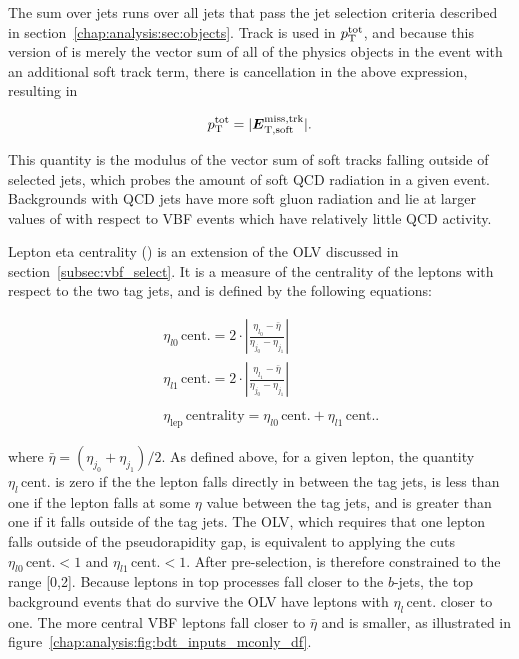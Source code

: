 \noindent
The sum over jets runs over all jets that pass the jet selection
criteria described in section~\ref{chap:analysis:sec:objects}. 
Track \vmet is used in $p_{\rm T}^{\rm tot}$, and because this version of \etmiss
is merely the
vector sum of all of the physics objects in the event with an
additional soft track term, there is cancellation in the above
expression, resulting in

\begin{equation}
\begin{aligned}
\label{chap:analysis:equation:pttot_2}
p_{\rm T}^{\rm tot} = |\boldsymbol{E}_{\mathrm{T,soft}}^{\mathrm{miss,trk}}|.
\end{aligned}
\end{equation}

\noindent
This quantity is the modulus of the vector sum of soft tracks
falling outside of selected jets, which probes the amount of soft QCD
radiation in a given event. Backgrounds with QCD jets have more soft
gluon radiation and lie at larger values of \pTtot with respect to VBF
events which have relatively little QCD activity. 

Lepton eta centrality (\lepEtaCent) is an extension of the OLV
discussed in section~\ref{subsec:vbf_select}. It is a measure of the
centrality of the leptons with respect to the two tag jets, and is
defined by the following equations:

\begin{eqnarray}
&& \eta_{l0} \, \textrm{cent.} = 2 \cdot
|\frac{\eta_{l_0}-\bar{\eta}}{\eta_{j_0}-\eta_{j_1}}|  \nonumber\\
&& \eta_{l1} \, \textrm{cent.} = 2 \cdot
|\frac{\eta_{l_1}-\bar{\eta}}{\eta_{j_0}-\eta_{j_1}}|  \nonumber\\
&&\nonumber \\
&& \eta_{\mathrm{lep}} \, \textrm{centrality}
= \eta_{l0} \, \textrm{cent.} + \eta_{l1} \, \textrm{cent.}.
\label{eqn:contOLV_def}
\end{eqnarray}

\noindent
where $\bar{\eta} = (\eta_{j_0}+\eta_{j_1})/2$. As defined above, for
a given lepton, the quantity $\eta_{l} \, \textrm{cent.}$ is zero if
the the lepton falls directly in between the tag jets, is less than
one if the lepton falls at some $\eta$ value between the tag jets, and is greater than one if
it falls outside of the tag jets. The OLV, which requires that one
lepton falls outside of the pseudorapidity gap, is equivalent to
applying the cuts $\eta_{l0} \, \textrm{cent.} < 1$ and 
$\eta_{l1} \, \textrm{cent.} < 1$. After pre-selection, \lepEtaCent is therefore constrained to the range [0,2]. Because
leptons in top processes fall closer to the $b$-jets, the top background
events that do survive the OLV have leptons with $\eta_{l} \, \textrm{cent.}$ closer to
one. The more central VBF leptons fall closer to $\bar{\eta}$
and \lepEtaCent is smaller, as illustrated in figure~\ref{chap:analysis:fig:bdt_inputs_mconly_df}.

